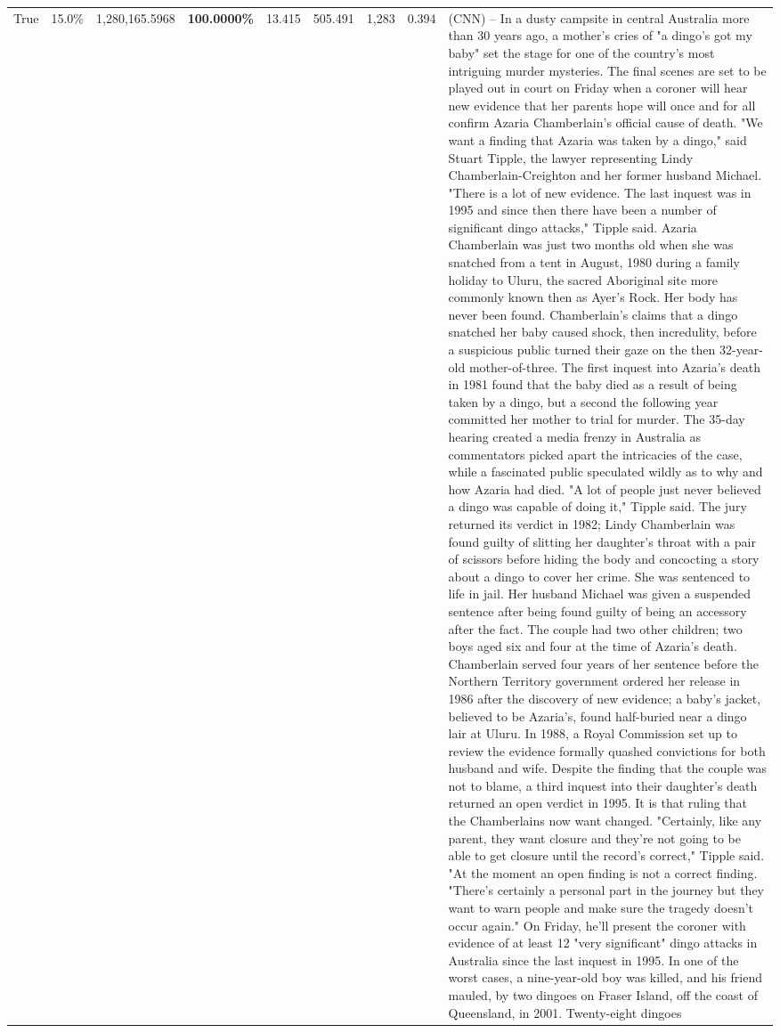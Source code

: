 \begin{table}[H]
\begin{tabular}{lllrlllll}
True & 15.0\% & 1,280,165.5968 & \bfseries \color{red} 100.0000\% & 13.415 & 505.491 & 1,283 & 0.394 & (CNN) -- In a dusty campsite in central Australia more than 30 years ago, a mother's cries of "a dingo's got my baby" set the stage for one of the country's most intriguing murder mysteries. The final scenes are set to be played out in court on Friday when a coroner will hear new evidence that her parents hope will once and for all confirm Azaria Chamberlain's official cause of death. "We want a finding that Azaria was taken by a dingo," said Stuart Tipple, the lawyer representing Lindy Chamberlain-Creighton and her former husband Michael. "There is a lot of new evidence. The last inquest was in 1995 and since then there have been a number of significant dingo attacks," Tipple said. Azaria Chamberlain was just two months old when she was snatched from a tent in August, 1980 during a family holiday to Uluru, the sacred Aboriginal site more commonly known then as Ayer's Rock. Her body has never been found. Chamberlain's claims that a dingo snatched her baby caused shock, then incredulity, before a suspicious public turned their gaze on the then 32-year-old mother-of-three. The first inquest into Azaria's death in 1981 found that the baby died as a result of being taken by a dingo, but a second the following year committed her mother to trial for murder. The 35-day hearing created a media frenzy in Australia as commentators picked apart the intricacies of the case, while a fascinated public speculated wildly as to why and how Azaria had died. "A lot of people just never believed a dingo was capable of doing it," Tipple said. The jury returned its verdict in 1982; Lindy Chamberlain was found guilty of slitting her daughter's throat with a pair of scissors before hiding the body and concocting a story about a dingo to cover her crime. She was sentenced to life in jail. Her husband Michael was given a suspended sentence after being found guilty of being an accessory after the fact. The couple had two other children; two boys aged six and four at the time of Azaria's death. Chamberlain served four years of her sentence before the Northern Territory government ordered her release in 1986 after the discovery of new evidence; a baby's jacket, believed to be Azaria's, found half-buried near a dingo lair at Uluru. In 1988, a Royal Commission set up to review the evidence formally quashed convictions for both husband and wife. Despite the finding that the couple was not to blame, a third inquest into their daughter's death returned an open verdict in 1995. It is that ruling that the Chamberlains now want changed. "Certainly, like any parent, they want closure and they're not going to be able to get closure until the record's correct," Tipple said. "At the moment an open finding is not a correct finding. "There's certainly a personal part in the journey but they want to warn people and make sure the tragedy doesn't occur again." On Friday, he'll present the coroner with evidence of at least 12 "very significant" dingo attacks in Australia since the last inquest in 1995. In one of the worst cases, a nine-year-old boy was killed, and his friend mauled, by two dingoes on Fraser Island, off the coast of Queensland, in 2001. Twenty-eight dingoes 
\end{tabular}
\end{table}
